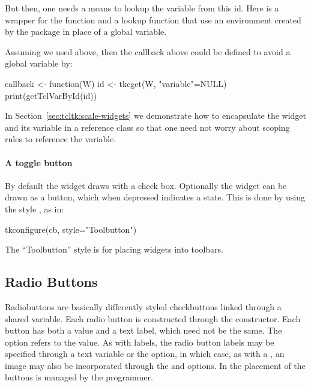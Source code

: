 But then, one needs a means to lookup the variable from this id. Here is a
wrapper for the  function and a lookup function that
use an environment created by the  package in place of a
global variable.

\begin{Schunk}
\end{Schunk}

Assuming we used  above, then the callback above
could be defined to avoid a global variable by:


\begin{Schunk}
\begin{Sinput}
 callback <- function(W) {
   id <- tkcget(W, "variable"=NULL)
   print(getTclVarById(id))
 }
\end{Sinput}
\end{Schunk}


In Section~\ref{sec:tcltk:scale-widgets} we demonstrate how to encapsulate the widget and its
variable in a reference class so that one need not worry about scoping
rules to reference the variable. 


\paragraph{A toggle button}

By default the widget draws with a check box. Optionally the widget
can be drawn as a button, which when depressed indicates a 
state. This is done by using the style , as in:
\begin{Schunk}
\begin{Sinput}
 tkconfigure(cb, style="Toolbutton")
\end{Sinput}
\end{Schunk}

The ``Toolbutton'' style is for placing widgets into toolbars.

\subsection{Radio Buttons}
\label{sec:tcltk:radio-buttons}

Radiobuttons are basically differently styled checkbuttons linked through a shared \TCL\/
variable. Each radio button is constructed through the
 constructor. Each button has both a value and
a text label, which need not be the same. The
 option refers to the
value. As with labels, the radio button labels may be specified
through a text variable or the  option,
in which case, as with a , an image may also be
incorporated through the  and
 options. In \TK\/ the placement of
the buttons is managed by the programmer.


